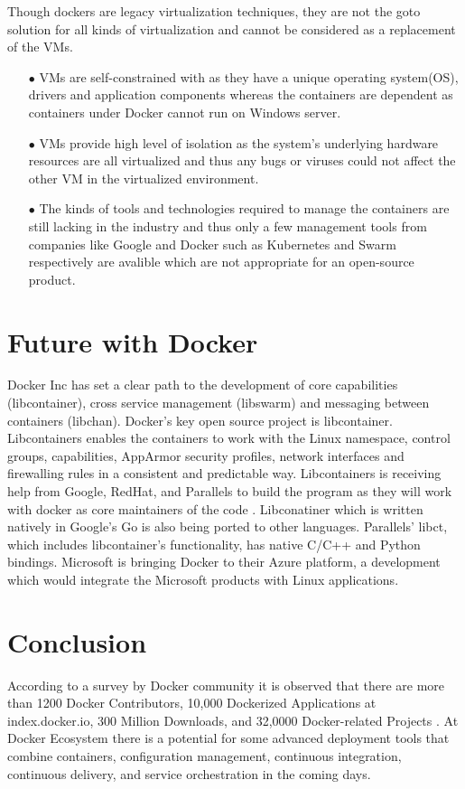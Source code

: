 \documentclass[9pt,twocolumn,twoside]{../../styles/osajnl}
\begin{document}
Though dockers are legacy virtualization techniques, they are not the
goto solution for all kinds of virtualization and cannot be considered
as a replacement of the VMs.
\begin{itemize}
\item[$\bullet$]VMs are self-constrained with as they have a unique
  operating system(OS), drivers and application components whereas the
  containers are dependent as containers under Docker cannot run on
  Windows server.

\item[$\bullet$]VMs provide high level of isolation as the system's
  underlying hardware resources are all virtualized and thus any bugs
  or viruses could not affect the other VM in the virtualized
  environment.

\item[$\bullet$]The kinds of tools and technologies required to manage
  the containers are still lacking in the industry and thus only a few
  management tools from companies like Google and Docker such as
  Kubernetes and Swarm respectively are avalible which are not
  appropriate for an open-source product.
\end{itemize}
\section{Future with Docker}

Docker Inc has set a clear path to the development of core
capabilities (libcontainer), cross service management (libswarm) and
messaging between containers (libchan). Docker's key open source
project is libcontainer. Libcontainers enables the containers to work
with the Linux namespace, control groups, capabilities, AppArmor
security profiles, network interfaces and firewalling rules in a
consistent and predictable way.  Libcontainers is receiving help from
Google, RedHat, and Parallels to build the program as they will work
with docker as core maintainers of the code
\cite{www-docker-1}. Libconatiner which is written natively in
Google's Go is also being ported to other languages. Parallels' libct,
which includes libcontainer's functionality, has native C/C++ and
Python bindings. Microsoft is bringing Docker to their Azure platform,
a development which would integrate the Microsoft products with Linux
applications.



\section{Conclusion}

According to a survey by Docker community it is observed that there
are more than 1200 Docker Contributors, 10,000 Dockerized Applications
at index.docker.io, 300 Million Downloads, and 32,0000 Docker-related
Projects \cite{www-docker-3}. At Docker Ecosystem there is a potential
for some advanced deployment tools that combine containers,
configuration management, continuous integration, continuous delivery,
and service orchestration in the coming days.



\end{document}
